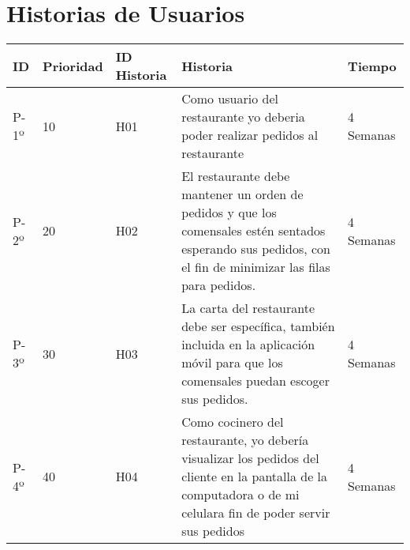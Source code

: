 \chapter{Historias de Usuarios}

\begin{table}[htbp]
	\begin{center}
		\begin{tabular}{| p{0.8cm}| p{2.0cm} | p{2.5 cm} | p{6.0cm}| p{2.0cm} |}
			\hline
			
			\textbf{ID} & \textbf{Prioridad}& \textbf{ID Historia} & \textbf{Historia} & \textbf{Tiempo}
			
			\\\hline
			P-1º & 10 & H01 &
			
			Como usuario del restaurante yo deberia poder realizar pedidos al restaurante 	
			
			& 4 Semanas
			
			\\\hline
			P-2º & 20 & H02 &
			
			El restaurante debe mantener un orden de pedidos y que los comensales estén sentados esperando sus pedidos, con el fin de minimizar las filas para pedidos.
			
			& 4 Semanas
			
			\\\hline
			P-3º & 30 & H03 &
			
			La carta del restaurante debe ser específica, también incluida en la aplicación móvil para que los comensales puedan escoger sus pedidos.
			
			& 4 Semanas
			
			\\\hline
			P-4º & 40 & H04 & 
			
			Como cocinero del restaurante, yo debería visualizar los pedidos del cliente en la pantalla de la computadora o de mi celulara fin de poder servir sus pedidos
			
			& 4 Semanas \\\hline
		\end{tabular}
	\end{center}
\end{table}